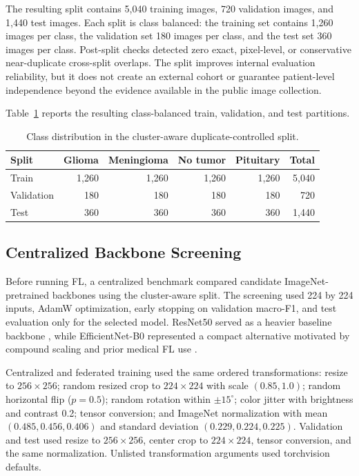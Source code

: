 \documentclass[conference]{IEEEtran}
\begin{document}
The resulting split contains 5,040 training images, 720 validation images, and 1,440 test images. Each split is class balanced: the training set contains 1,260 images per class, the validation set 180 images per class, and the test set 360 images per class. Post-split checks detected zero exact, pixel-level, or conservative near-duplicate cross-split overlaps. The split improves internal evaluation reliability, but it does not create an external cohort or guarantee patient-level independence beyond the evidence available in the public image collection.

Table~\ref{tab:split-counts} reports the resulting class-balanced train, validation, and test partitions.

\begin{table}[t]
\centering
\caption{Class distribution in the cluster-aware duplicate-controlled split.}
\label{tab:split-counts}
\scriptsize
\setlength{\tabcolsep}{2pt}
\begin{tabular*}{\columnwidth}{@{\extracolsep{\fill}}lrrrrr@{}}
\toprule
Split & Glioma & Meningioma & No tumor & Pituitary & Total \\
\midrule
Train & 1,260 & 1,260 & 1,260 & 1,260 & 5,040 \\
Validation & 180 & 180 & 180 & 180 & 720 \\
Test & 360 & 360 & 360 & 360 & 1,440 \\
\bottomrule
\end{tabular*}
\end{table}

\subsection{Centralized Backbone Screening}
Before running FL, a centralized benchmark compared candidate ImageNet-pretrained backbones using the cluster-aware split. The screening used 224 by 224 inputs, AdamW optimization, early stopping on validation macro-F1, and test evaluation only for the selected model. ResNet50 served as a heavier baseline backbone \cite{he2016resnet}, while EfficientNet-B0 represented a compact alternative motivated by compound scaling and prior medical FL use \cite{tan2019efficientnet,abubakr2026explainable}.

Centralized and federated training used the same ordered transformations: resize to $256\times256$; random resized crop to $224\times224$ with scale $(0.85,1.0)$; random horizontal flip ($p=0.5$); random rotation within $\pm15^\circ$; color jitter with brightness and contrast 0.2; tensor conversion; and ImageNet normalization with mean $(0.485,0.456,0.406)$ and standard deviation $(0.229,0.224,0.225)$. Validation and test used resize to $256\times256$, center crop to $224\times224$, tensor conversion, and the same normalization. Unlisted transformation arguments used torchvision defaults.
\end{document}

